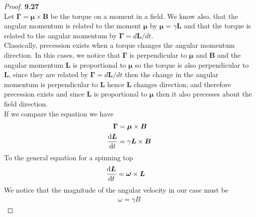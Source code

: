 \documentclass[11pt]{article}
\theoremstyle{definition}
\begin{document}
\cleardoublepage
\begin{proof}{\textbf{9.27}}\\
Let $\bm{\Gamma} = \bm{\mu} \times \bm{B}$ be the torque on a moment in a field.
We know also, that the angular momentum is related to the moment $\bm{\mu}$ by
$\bm{\mu} = \gamma \bm{L}$ and that the torque is related to the angular
momentum by $\bm{\Gamma} = d\bm{L}/dt$.
\\
Classically, precession exists when a torque changes the angular momentum
direction. In this cases, we notice that $\bm{\Gamma}$ is perpendicular to 
$\bm{\mu}$ and $\bm{B}$ and the angular momentum $\bm{L}$ is proportional to
$\bm{\mu}$ so the torque is also perpendicular to $\bm{L}$, since they are
related by $\bm{\Gamma} = d\bm{L}/dt$ then the change in the angular momentum
is perpendicular to $\bm{L}$ hence $\bm{L}$ changes direction, and therefore
precession exists and since $\bm{L}$ is proportional to $\bm{\mu}$ then it also
precesses about the field direction.
\\
If we compare the equation we have
\begin{align*}
    \bm{\Gamma} &= \bm{\mu} \times \bm{B}\\
    \dv{\bm{L}}{t} &= \gamma\bm{L} \times \bm{B}
\end{align*}
To the general equation for a spinning top
\begin{align*}
    \dv{\bm{L}}{t} &= \bm{\omega} \times \bm{L} 
\end{align*}
We notice that the magnitude of the angular velocity in our case must be
\begin{align*}
    \omega =  \gamma B
\end{align*}
\end{proof}
\end{document}
